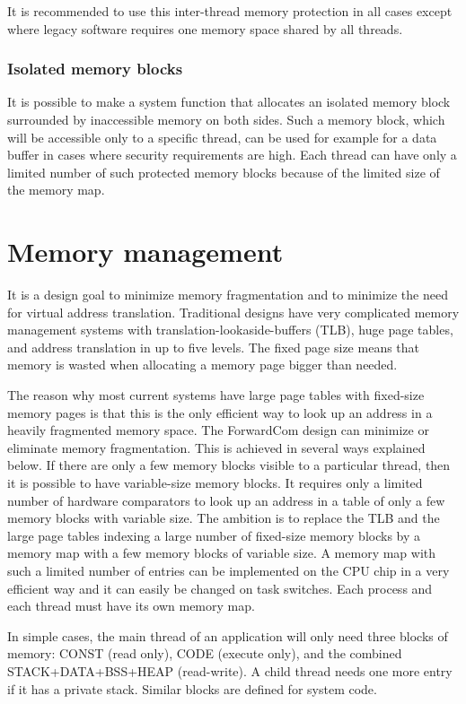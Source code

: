 \documentclass[forwardcom.tex]{subfiles}
\begin{document}
It is recommended to use this inter-thread memory protection in all cases except where legacy software requires one memory space shared by all threads. 
\vv

\subsubsection{Isolated memory blocks} \label{isolatedMemoryBlocks}
It is possible to make a system function that allocates an isolated memory block surrounded by inaccessible memory on both sides. Such a memory block, which will be accessible only to a specific thread, can be used for example for a data buffer in cases where security requirements are high. Each thread can have only a limited number of such protected memory blocks because of the limited size of the memory map.

\section{Memory management} \label{memoryManagement}
It is a design goal to minimize memory fragmentation and to minimize the need for virtual address translation. Traditional designs have very complicated memory management systems with translation-lookaside-buffers (TLB), huge page tables, and address translation in up to five levels. The fixed page size means that memory is wasted when allocating a memory page bigger than needed.
\vv

The reason why most current systems have large page tables with fixed-size memory pages is that this is the only efficient way to look up an address in a heavily fragmented memory space. The ForwardCom design can minimize or eliminate memory fragmentation. This is achieved in several ways explained below. If there are only a few memory blocks visible to a particular thread, then it is possible to have variable-size memory blocks. It requires only a limited number of hardware comparators to look up an address in a table of only a few memory blocks with variable size. The ambition is to replace the TLB and the large page tables indexing a large number of fixed-size memory blocks by a memory map with a few memory blocks of variable size. 
A memory map with such a limited number of entries can be implemented on the CPU chip in a very efficient way and it can easily be changed on task switches. Each process and each thread must have its own memory map.
\vv

In simple cases, the main thread of an application will only need three blocks of memory: CONST (read only), CODE (execute only), and the combined STACK+DATA+BSS+HEAP (read-write). A child thread needs one more entry if it has a private stack. Similar blocks are defined for system code. 
\vv
\end{document}
